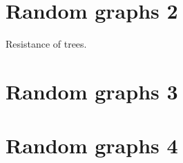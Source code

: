 \documentclass[11pt,fleqn]{book} %
\begin{document}
\newpage 
 \chapter{Random graphs 2}


\begin{problem}
  Resistance of trees. 
\end{problem}











\newpage 
    \chapter{Random graphs 3}
\kapiteldatum{}


\newpage 
    \chapter{Random graphs 4}
\kapiteldatum{}
\end{document}
